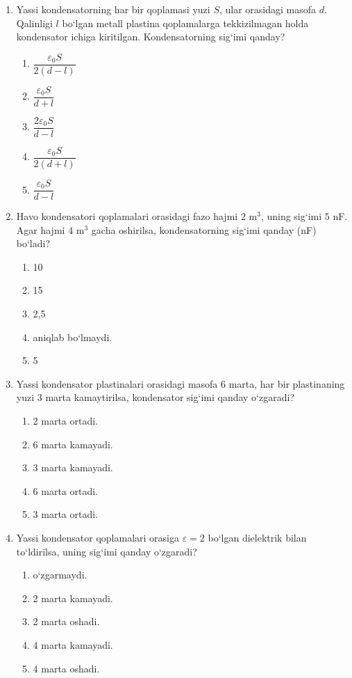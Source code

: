 \begin{enumerate}
\item Yassi kondensatorning har bir qoplamasi yuzi $S$, ular orasidagi masofa $d$. Qalinligi $l$ bo‘lgan metall plastina qoplamalarga tekkizilmagan holda kondensator ichiga kiritilgan. Kondensatorning sig‘imi qanday?
\begin{enumerate}[label=\Alph*)]
\item $\dfrac{\varepsilon_0 S}{2(d-l)}$
\item $\dfrac{\varepsilon_0 S}{d+l}$
\item $\dfrac{2\varepsilon_0 S}{d-l}$
\item $\dfrac{\varepsilon_0 S}{2(d+l)}$
\item $\dfrac{\varepsilon_0 S}{d-l}$
\end{enumerate}

\item Havo kondensatori qoplamalari orasidagi fazo hajmi $2$ m$^3$, uning sig‘imi $5$ nF. Agar hajmi $4$ m$^3$ gacha oshirilsa, kondensatorning sig‘imi qanday (nF) bo‘ladi?
\begin{enumerate}[label=\Alph*)]
\item 10
\item 15
\item 2,5
\item aniqlab bo‘lmaydi.
\item 5
\end{enumerate}

\item Yassi kondensator plastinalari orasidagi masofa $6$ marta, har bir plastinaning yuzi $3$ marta kamaytirilsa, kondensator sig‘imi qanday o‘zgaradi?
\begin{enumerate}[label=\Alph*)]
\item 2 marta ortadi.
\item 6 marta kamayadi.
\item 3 marta kamayadi.
\item 6 marta ortadi.
\item 3 marta ortadi.
\end{enumerate}

\item Yassi kondensator qoplamalari orasiga $\varepsilon=2$ bo‘lgan dielektrik bilan to‘ldirilsa, uning sig‘imi qanday o‘zgaradi?
\begin{enumerate}[label=\Alph*)]
\item o‘zgarmaydi.
\item 2 marta kamayadi.
\item 2 marta oshadi.
\item 4 marta kamayadi.
\item 4 marta oshadi.
\end{enumerate}


\end{enumerate}
